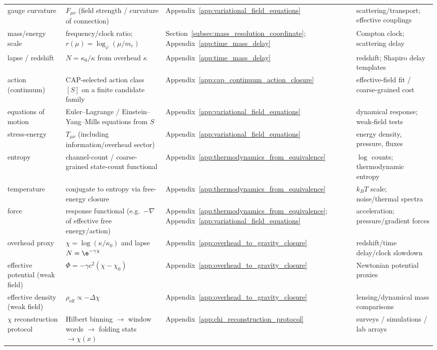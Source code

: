 \begin{longtable}{p{} p{} p{} p{}}
gauge curvature & $F_{\mu\nu}$ (field strength / curvature of connection) & Appendix~\ref{app:variational_field_equations} & scattering/transport; effective couplings \\
mass/energy scale & frequency/clock ratio; $r(\mu)=\log_\varphi(\mu/m_e)$ & Section~\ref{subsec:mass_resolution_coordinate}; Appendix~\ref{app:time_mass_delay} & Compton clock; scattering delay \\
lapse / redshift & $N=\kappa_0/\kappa$ from overhead $\kappa$ & Appendix~\ref{app:time_mass_delay} & redshift; Shapiro delay templates \\
action (continuum) & CAP-selected action class $[S]$ on a finite candidate family & Appendix~\ref{app:cap_continuum_action_closure} & effective-field fit / coarse-grained cost \\
equations of motion & Euler--Lagrange / Einstein--Yang--Mills equations from $S$ & Appendix~\ref{app:variational_field_equations} & dynamical response; weak-field tests \\
stress-energy & $T_{\mu\nu}$ (including information/overhead sector) & Appendix~\ref{app:variational_field_equations} & energy density, pressure, fluxes \\
entropy & channel-count / coarse-grained state-count functional & Appendix~\ref{app:thermodynamics_from_equivalence} & $\log$ counts; thermodynamic entropy \\
temperature & conjugate to entropy via free-energy closure & Appendix~\ref{app:thermodynamics_from_equivalence} & $k_BT$ scale; noise/thermal spectra \\
force & response functional (e.g.\ $-\nabla$ of effective free energy/action) & Appendix~\ref{app:thermodynamics_from_equivalence}; Appendix~\ref{app:variational_field_equations} & acceleration; pressure/gradient forces \\
overhead proxy & $\chi=\log(\kappa/\kappa_0)$ and lapse $N=\e^{-\gamma\chi}$ & Appendix~\ref{app:overhead_to_gravity_closure} & redshift/time delay/clock slowdown \\
effective potential (weak field) & $\Phi=-\gamma c^2(\chi-\chi_0)$ & Appendix~\ref{app:overhead_to_gravity_closure} & Newtonian potential proxies \\
effective density (weak field) & $\rho_{\mathrm{eff}}\propto -\Delta\chi$ & Appendix~\ref{app:overhead_to_gravity_closure} & lensing/dynamical mass comparisons \\
$\chi$ reconstruction protocol & Hilbert binning $\to$ window words $\to$ folding stats $\to \chi(x)$ & Appendix~\ref{app:chi_reconstruction_protocol} & surveys / simulations / lab arrays \\

\end{longtable}
